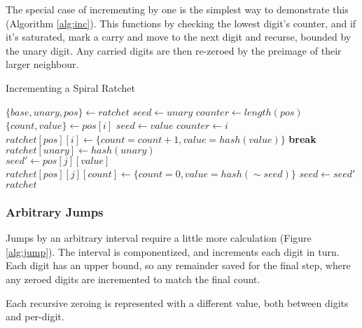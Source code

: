 \documentclass{article}
\begin{document}
	\FloatBarrier
	
	The special case of incrementing by one is the simplest way to demonstrate this (Algorithm \ref{alg:inc}). This functions by checking the lowest digit's counter, and if it's saturated, mark a carry and move to the next digit and recurse, bounded by the unary digit. Any carried digits are then re-zeroed by the preimage of their larger neighbour.
	
	\begin{algorithm}
		\caption{Incrementing a Spiral Ratchet}
		\label{alg:inc}

		\begin{algorithmic}[1]
				\State $\{base, unary, pos\} \gets ratchet$
				\State $seed \gets unary$
				\State $counter \gets length(pos)$
				\\
					\State $\{count, value\} \gets pos[i]$
					 
						\State $seed \gets value$
						\State $counter \gets i$
						\State $ratchet[pos][i] \gets \{ count = count + 1, value = hash(value)\}$
						\State \textbf{break}
					\EndIf
				\EndFor
				\\
				 
					\State $ratchet[unary] \gets hash(unary)$
				\EndIf
				\\
					 
						\State $seed' \gets pos[j][value]$
						\State $ratchet[pos][j][count] \gets \{count = 0, value = hash(\sim{seed})\}$
						\State $seed \gets seed'$
					\EndFor
				\EndIf
				\\
				\State $ratchet$
				\EndFunction
		\end{algorithmic}
	\end{algorithm}

	\subsubsection{Arbitrary Jumps}

	Jumps by an arbitrary interval require a little more calculation (Figure \ref{alg:jump}). The interval is componentized, and increments each digit in turn. Each digit has an upper bound, so any remainder saved for the final step, where any zeroed digits are incremented to match the final count.
	
	Each recursive zeroing is represented with a different value, both between digits and per-digit.
\end{document}
